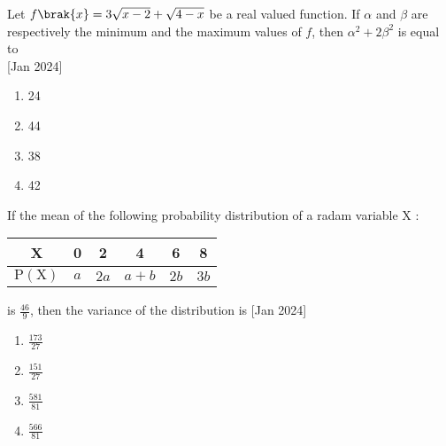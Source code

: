         \item{
        	
        	Let $f\brak{x}=3 \sqrt{x-2}+\sqrt{4-x}$ be a real valued function. If $\alpha$ and $\beta$ are respectively the minimum and the maximum values of $f$, then $\alpha^{2}+2 \beta^{2}$ is equal to\\
        	\text{ }
        	\hfill
        	{[Jan 2024]}
        	
        	\begin{multicols}{4}
        		\begin{enumerate}
        			\item 24
        			\item 44
        			\item 38
        			\item 42
        		\end{enumerate}
        	\end{multicols}
        	
        }
 	\item{
        	 If the mean of the following probability distribution of a radam variable X :
        	 \begin{center}
	        	\begin{tabular}{|c|c|c|c|c|c|}
	        		\hline X & 0 & 2 & 4 & 6 & 8 \\
	        		\hline $\mathrm{P}(\mathrm{X})$ & $a$ & $2 a$ & $a+b$ & $2 b$ & $3 b$ \\
	        		\hline
	        	\end{tabular}
        	\end{center}
        	is $\frac{46}{9}$, then the variance of the distribution is
        	\hfill
        	{[Jan 2024]}
        	
        	\begin{multicols}{4}
        		\begin{enumerate}
        			\item $\frac{173}{27}$
        			\item $\frac{151}{27}$
        			\item $\frac{581}{81}$
        			\item $\frac{566}{81}$
        		\end{enumerate}
        	\end{multicols}
        	
        }
 	

